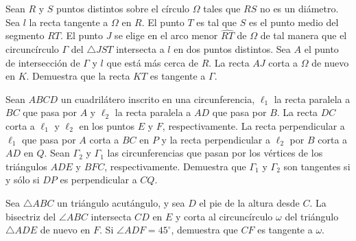 \documentclass{article}
\begin{document}
\begin{ejercicio}
    Sean $R$ y $S$ puntos distintos sobre el círculo $\Omega$ tales que 
    $RS$ no es un diámetro. Sea $l$ la recta tangente a $\Omega$ en $R$.
    El punto $T$ es tal que $S$ es el punto medio del segmento $RT$. El punto
    $J$ se elige en el arco menor $\widehat{RT}$ de $\Omega$ de tal manera que
    el circuncírculo $\Gamma$ del $\triangle JST$ intersecta a $l$ en 
    dos puntos distintos. Sea $A$ el punto de intersección de $\Gamma$ y $l$
    que está más cerca de $R$. La recta $AJ$ corta a $\Omega$ de nuevo en $K$.
    Demuestra que la recta $KT$ es tangente a $\Gamma$.
\end{ejercicio}

\begin{ejercicio}
    Sean $ABCD$ un cuadrilátero inscrito en una circunferencia, $\ell_1$ la recta paralela a $BC$ que
    pasa por $A$ y $\ell_2$ la recta paralela a $AD$ que pasa por $B$. La recta $DC$ corta a $\ell_1$ y $\ell_2$ en los
    puntos $E$ y $F$, respectivamente. La recta perpendicular a $\ell_1$ que pasa por $A$ corta a $BC$ en
    $P$ y la recta perpendicular a $\ell_2$ por $B$ corta a $AD$ en $Q$. Sean $\Gamma_2$ y $\Gamma_1$ las circunferencias
    que pasan por los vértices de los triángulos $ADE$ y $BFC$, respectivamente. Demuestra
    que $\Gamma_1$ y $\Gamma_2$ son tangentes si y sólo si $DP$ es perpendicular a $CQ$.
\end{ejercicio}

\begin{ejercicio}
    Sea $\triangle ABC$ un triángulo acutángulo, y sea $D$ el pie de la 
    altura desde $C$. La bisectriz del $\angle ABC$ intersecta $CD$ en 
    $E$ y corta al circuncírculo $\omega$ del triángulo $\triangle ADE$
    de nuevo en $F$. Si $\angle ADF = 45^{\circ}$, demuestra que $CF$ es 
    tangente a $\omega$.
\end{ejercicio}
\end{document}
